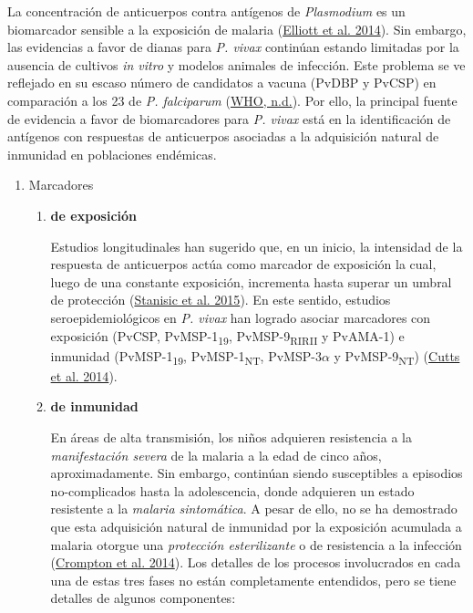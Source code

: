 \documentclass[
  a4paper]{article}
\begin{document}
La concentración de anticuerpos contra antígenos de \emph{Plasmodium} es
un biomarcador sensible a la exposición de malaria
(\protect\hyperlink{ref-elliott2014}{Elliott et al. 2014}). Sin embargo,
las evidencias a favor de dianas para \emph{P. vivax} continúan estando
limitadas por la ausencia de cultivos \emph{in vitro} y modelos animales
de infección. Este problema se ve reflejado en su escaso número de
candidatos a vacuna (PvDBP y PvCSP) en comparación a los 23 de \emph{P.
falciparum} (\protect\hyperlink{ref-rainbow2016}{WHO, n.d.}). Por ello,
la principal fuente de evidencia a favor de biomarcadores para \emph{P.
vivax} está en la identificación de antígenos con respuestas de
anticuerpos asociadas a la adquisición natural de inmunidad en
poblaciones endémicas.

\begin{enumerate}
\def\labelenumi{\alph{enumi}.}
\item
  Marcadores

  \begin{enumerate}
  \def\labelenumii{\roman{enumii}.}
  \item
    \textbf{de exposición}

    Estudios longitudinales han sugerido que, en un inicio, la
    intensidad de la respuesta de anticuerpos actúa como marcador de
    exposición la cual, luego de una constante exposición, incrementa
    hasta superar un umbral de protección
    (\protect\hyperlink{ref-Stanisic2015}{Stanisic et al. 2015}). En
    este sentido, estudios seroepidemiológicos en \emph{P. vivax} han
    logrado asociar marcadores con exposición (PvCSP,
    PvMSP-1\textsubscript{19}, PvMSP-9\textsubscript{RIRII} y PvAMA-1) e
    inmunidad (PvMSP-1\textsubscript{19}, PvMSP-1\textsubscript{NT},
    PvMSP-3\(\alpha\) y PvMSP-9\textsubscript{NT})
    (\protect\hyperlink{ref-cutts2014meta}{Cutts et al. 2014}).
  \item
    \textbf{de inmunidad}

    En áreas de alta transmisión, los niños adquieren resistencia a la
    \emph{manifestación severa} de la malaria a la edad de cinco años,
    aproximadamente. Sin embargo, continúan siendo susceptibles a
    episodios no-complicados hasta la adolescencia, donde adquieren un
    estado resistente a la \emph{malaria sintomática}. A pesar de ello,
    no se ha demostrado que esta adquisición natural de inmunidad por la
    exposición acumulada a malaria otorgue una \emph{protección
    esterilizante} o de resistencia a la infección
    (\protect\hyperlink{ref-crompton2014rev}{Crompton et al. 2014}). Los
    detalles de los procesos involucrados en cada una de estas tres
    fases no están completamente entendidos, pero se tiene detalles de
    algunos componentes:


\end{enumerate}
\end{enumerate}
\end{document}
